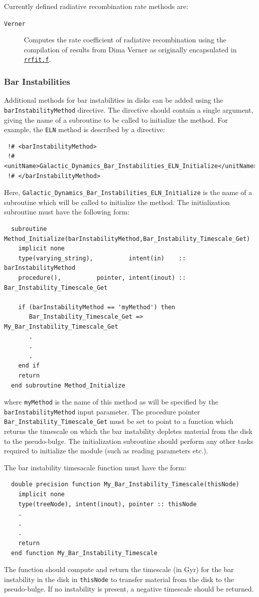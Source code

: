 Currently defined radiative recombination rate methods are:
\begin{description}
 \item [{\tt Verner}]  Computes the rate coefficient of radiative recombination using the compilation of results from Dima Verner as originally encapsulated in \href{ftp://gradj.pa.uky.edu//dima//rec//rrfit.f}{{\tt rrfit.f}}.
\end{description}

\subsubsection{Bar Instabilities}

Additional methods for bar instabilities in disks can be added using the {\tt barInstabilityMethod} directive. The directive should contain a single argument, giving the name of a subroutine to be called to initialize the method. For example, the {\tt ELN} method is described by a directive:
\begin{verbatim}
 !# <barInstabilityMethod>
 !#  <unitName>Galactic_Dynamics_Bar_Instabilities_ELN_Initialize</unitName>
 !# </barInstabilityMethod>
\end{verbatim}
Here, {\tt Galactic\_Dynamics\_Bar\_Instabilities\_ELN\_Initialize} is the name of a subroutine which will be called to initialize the method. The initialization subroutine must have the following form:
\begin{verbatim}
  subroutine Method_Initialize(barInstabilityMethod,Bar_Instability_Timescale_Get)
    implicit none
    type(varying_string),          intent(in)    :: barInstabilityMethod
    procedure(),          pointer, intent(inout) :: Bar_Instability_Timescale_Get
    
    if (barInstabilityMethod == 'myMethod') then
       Bar_Instability_Timescale_Get => My_Bar_Instability_Timescale_Get
       .
       .
       .
    end if
    return
  end subroutine Method_Initialize
\end{verbatim}
where {\tt myMethod} is the name of this method as will be specified by the {\tt barInstabilityMethod} input parameter. The procedure pointer {\tt Bar\_Instability\_Timescale\_Get} must be set to point to a function which returns the timescale on which the bar instability depletes material from the disk to the pseudo-bulge. The initialization subroutine should perform any other tasks required to initialize the module (such as reading parameters etc.).

The bar instability timesacale function must have the form:
\begin{verbatim}
  double precision function My_Bar_Instability_Timescale(thisNode)
    implicit none
    type(treeNode), intent(inout), pointer :: thisNode
    .
    .
    .
    return
  end function My_Bar_Instability_Timescale
\end{verbatim}
The function should compute and return the timescale (in Gyr) for the bar instability in the disk in {\tt thisNode} to transfer material from the disk to the pseudo-bulge. If no instability is present, a negative timescale should be returned.

